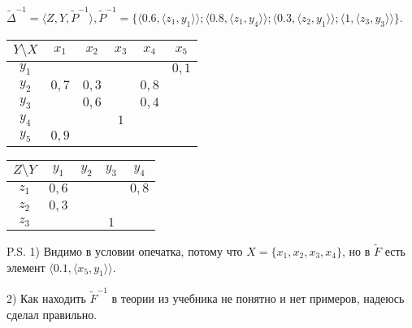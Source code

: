 \documentclass{article}
\begin{document}
$\widetilde{\Delta}^{-1} = \langle Z, Y, \widetilde{P}^{-1}\rangle, \widetilde{P}^{-1} = \{\langle 0.6, \langle z_1, y_1\rangle\rangle; \langle 0.8, \langle z_1, y_4\rangle\rangle; \langle 0.3, \langle z_2, y_1\rangle\rangle; \langle 1, \langle z_3, y_3\rangle\rangle\}$.
\begin{center}
\begin{tabular}{|c|c|c|c|c|c|}
\hline
$Y\setminus X$ & $x_1$ & $x_2$ & $x_3$ & $x_4$ & $x_5$ \\
\hline
$y_1$ &  &  &  &  & $0,1$ \\
\hline
$y_2$ & $0,7$ & $0,3$ &  & $0,8$ &  \\
\hline
$y_3$ &  & $0,6$ &  & $0,4$ & \\
\hline
$y_4$ &  &  & $1$ &  &  \\
\hline
$y_5$ & $0,9$ &  &  &  &  \\
\hline
\end{tabular}
\begin{tabular}{|c|c|c|c|c|}
\hline
$Z\setminus Y$ & $y_1$ & $y_2$ & $y_3$ & $y_4$ \\
\hline
$z_1$ & $0,6$ &  &  & $0,8$ \\
\hline
$z_2$ & $0,3$ &  &  &  \\
\hline
$z_3$ &  &  &  $1$ & \\
\hline
\end{tabular}
\end{center}

P.S. 1) Видимо в условии опечатка, потому что $X = \{x_1, x_2, x_3, x_4\}$, но в
$\widetilde{F}$ есть элемент $\langle 0.1, \langle x_5, y_1\rangle\rangle$.

2) Как находить $\widetilde{F}^{-1}$ в теории из учебника не понятно и нет примеров, надеюсь сделал правильно.
\end{document}

